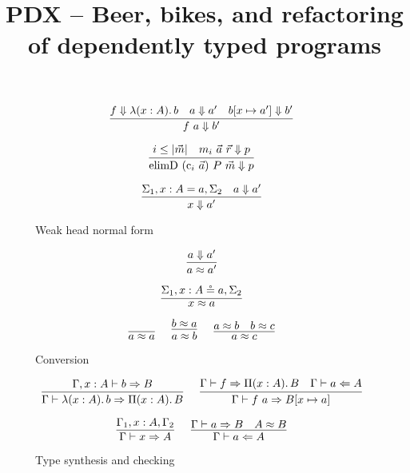\documentclass{article}
\title{PDX -- Beer, bikes, and refactoring of dependently typed programs}
\begin{document}
\maketitle

\begin{figure}[h]
\caption{Weak head normal form}

$$
\infer
  []
  {\whnf{\app{f}{a}}{b'}}
{
  \whnf{f}{\lam{x}{A}{b}}
  &
  \whnf{a}{a'}
  &
  \whnf{\sub{b}{x}{a'}}{b'}
}
$$

$$
\infer
  []
  {\whnf{\con{elimD}~(\con{c}_i~\vec{a})~P~\vec{m}}{p}}
{
  i \leq |\vec{m}|
  &
  \whnf{m_i~\vec{a}~\vec{r}}{p}
}
$$


$$
\infer
  []
  {\whnf{x}{a'}}
{
  \Sigma_1, \sigd{x}{A}{a}, \Sigma_2
  &
  \whnf{a}{a'}
}
$$

\end{figure}

\begin{figure}[h]
\caption{Conversion}

$$
\infer
  []
  {\conv{a}{a'}}
{
  \whnf{a}{a'}
}
$$

$$
\infer
  []
  {\conv{x}{a}}
{
  \Sigma_1, \sigr{x}{A}{a}, \Sigma_2
}
$$

$$
\infer
  []
  {\conv{a}{a}}
{
}
\quad
\infer
  []
  {\conv{a}{b}}
{
  \conv{b}{a}
}
\quad
\infer
  []
  {\conv{a}{c}}
{
  \conv{a}{b}
  &
  \conv{b}{c}
}
$$


\end{figure}

\begin{figure}[h]
\caption{Type synthesis and checking}

$$
\infer
  []
  {\synthG{\lam{x}{A}{b}}{\pie{x}{A}{B}}}
{
  \synth{\Gamma, x : A}{b}{B}
}
\quad
\infer
  []
  {\synthG{\app{f}{a}}{\sub{B}{x}{a}}}
{
  \synthG{f}{\pie{x}{A}{B}}
  &
  \chekG{a}{A}
}
$$

$$
\infer
  []
  {\synthG{x}{A}}
{
  \Gamma_1, x : A, \Gamma_2
}
\quad
\infer
  []
  {\chekG{a}{A}}
{
  \synthG{a}{B}
  &
  \conv{A}{B}
}
$$

\end{figure}
\end{document}
